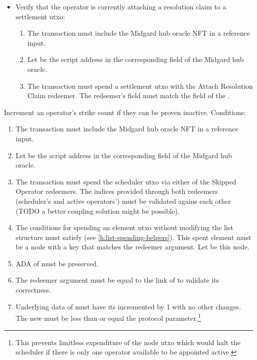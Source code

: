 \documentclass[../midgard.tex]{subfiles}
\begin{document}
\begin{description}
\begin{itemize}
\begin{enumerate}
                \item The  field of  must remain unchanged.
            \end{enumerate}
            \item Verify that the operator is currently attaching a resolution claim to a settlement utxo:
            \begin{enumerate}[resume]
                \item The transaction must include the Midgard hub oracle NFT in a reference input.
                \item Let  be the script address in the corresponding field of the Midgard hub oracle.
                \item The transaction must spend a settlement utxo with the Attach Resolution Claim redeemer.
                  The redeemer's  field must match the  field of the .
            \end{enumerate}
        \end{itemize}
    \item[Strike for Inactivity.] Increment an operator's strike count if they can be proven inactive.
      Conditions:
        \begin{enumerate}
          \item The transaction must include the Midgard hub oracle NFT in a reference input.
          \item Let  be the script address in the corresponding field of the Midgard hub oracle.
          \item The transaction must spend the scheduler utxo via either of the Skipped Operator redeemers.
            The indices provided through both redeemers (scheduler's and active operators') must be validated agains each other (TODO a better coupling solution might be possible).
          \item The conditions for spending an element utxo without modifying the list structure must satisfy (see \cref{h:list-spending-helpers}).
            This spent element must be a node with a key that matches the  redeemer argument.
            Let  be this node.
          \item ADA of  must be preserved.
          \item The  redeemer argument must be equal to the link of  to validate its correctness.
          \item Underlying data of  must have its  incremented by 1 with no other changes.
            The new  must be less than or equal the  protocol parameter.\footnote{This prevents limitless expenditure of the node utxo which would halt the scheduler if there is only one operator available to be appointed active.}
        \end{enumerate}
\end{description}
\end{document}
